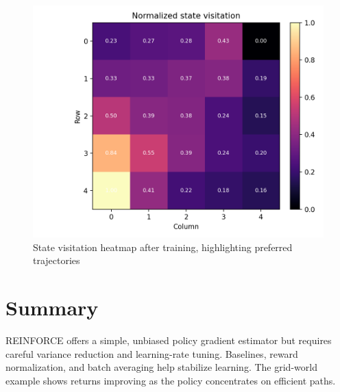 ﻿\documentclass[12pt]{article}
\begin{document}
\begin{figure}[H]
  \centering
  \includegraphics[width=0.82\linewidth]{reinforce_state_visitation.png}
  \caption{State visitation heatmap after training, highlighting preferred trajectories}
  \label{fig:reinforce_state_visitation}
\end{figure}

\FloatBarrier
\section{Summary}
REINFORCE offers a simple, unbiased policy gradient estimator but requires careful variance reduction and learning-rate tuning. Baselines, reward normalization, and batch averaging help stabilize learning. The grid-world example shows returns improving as the policy concentrates on efficient paths.
\end{document}
